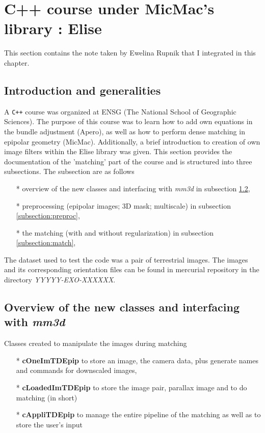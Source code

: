
\section{C++ course under MicMac's library : Elise}

This section contains the note taken by Ewelina Rupnik that I integrated in this chapter.

\subsection{Introduction and generalities}
A \verb!C++! course was organized at ENSG (The National School of Geographic Sciences). The purpose of this course was to learn how to add own equations in the bundle adjustment (Apero), as well as how to perform dense matching in epipolar geometry (MicMac). Additionally, a brief introduction to creation of own image filters within the Elise library was given.\newline
This section provides the documentation of the 'matching' part of the course and is structured into three subsections. The subsection are as follows
\begin{itemize}
  \item[*] overview of the new classes and interfacing with \emph{mm3d} in subsection \ref{subsection:class},
  \item[*] preprocessing (epipolar images; 3D mask; multiscale) in subsection \ref{subsection:preproc},
  \item[*] the matching (with and without regularization) in subsection \ref{subsection:match},
\end{itemize}

The dataset used to test the code was a pair of terrestrial images. The images and its corresponding orientation files can be found in mercurial repository in the directory \emph{YYYYY-EXO-XXXXXX}.

\subsection{Overview of the new classes and interfacing with \emph{mm3d} }\label{subsection:class}
Classes created to manipulate the images during matching
\begin{itemize}
  \item[*] \textbf{cOneImTDEpip} to store an image, the camera data, plus generate names and commands for downscaled images,
  \item[*] \textbf{cLoadedImTDEpip} to store the image pair, parallax image and to do matching (in short)
  \item[*] \textbf{cAppliTDEpip} to manage the entire pipeline of the matching as well as to store the user's input\newline
\end{itemize}

